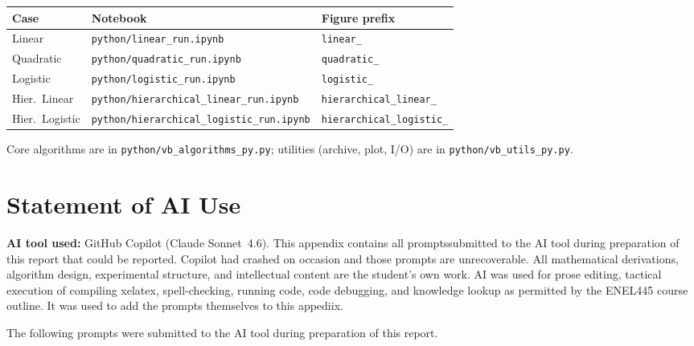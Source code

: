 \documentclass[11pt,a4paper]{article}
\begin{document}
\begin{center}
\begin{tabular}{@{}lll@{}}
\toprule
Case & Notebook & Figure prefix \\
\midrule
Linear          & \texttt{python/linear\_run.ipynb}                  & \texttt{linear\_} \\
Quadratic       & \texttt{python/quadratic\_run.ipynb}               & \texttt{quadratic\_} \\
Logistic        & \texttt{python/logistic\_run.ipynb}                & \texttt{logistic\_} \\
Hier.~Linear    & \texttt{python/hierarchical\_linear\_run.ipynb}    & \texttt{hierarchical\_linear\_} \\
Hier.~Logistic  & \texttt{python/hierarchical\_logistic\_run.ipynb}  & \texttt{hierarchical\_logistic\_} \\
\bottomrule
\end{tabular}
\end{center}

Core algorithms are in \texttt{python/vb\_algorithms\_py.py};
utilities (archive, plot, I/O) are in \texttt{python/vb\_utils\_py.py}.



\section{Statement of AI Use}
\label{app:ai-use}

\noindent\textbf{AI tool used:} GitHub Copilot (Claude Sonnet~4.6).
This appendix contains all promptssubmitted to the AI tool during preparation of this report that could be reported.  Copilot had crashed on occasion and those prompts are unrecoverable. 
\medskip
\noindent All mathematical derivations, algorithm design, experimental structure,
and intellectual content are the student's own work. AI was used for prose
editing, tactical execution of compiling xelatex, spell-checking, running code,
code debugging, and knowledge lookup as permitted by the ENEL445 course outline. It was used to add the prompts themselves to this appediix. 

\medskip
\noindent The following prompts were submitted to the AI tool during preparation
of this report.


\end{document}
